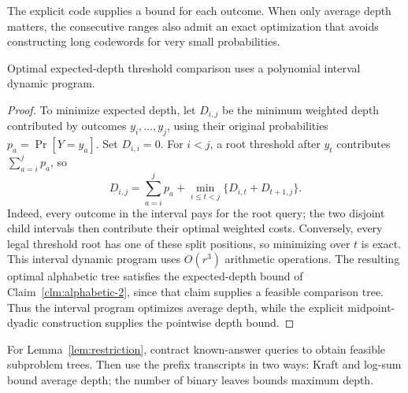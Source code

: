 The explicit code supplies a bound for each outcome. When only average
depth matters, the consecutive ranges also admit an exact optimization
that avoids constructing long codewords for very small probabilities.

\begin{claim}
\label{clm:alphabetic-3}
Optimal expected-depth threshold comparison uses a polynomial interval dynamic program.
\end{claim}
\begin{proof}
To minimize expected depth, let $D_{i,j}$ be the minimum weighted
depth contributed by outcomes $y_i,\ldots,y_j$, using their original
probabilities $p_a=\Pr[Y=y_a]$. Set $D_{i,i}=0$. For $i<j$, a root
threshold after $y_t$ contributes $\sum_{a=i}^j p_a$, so
\[
 D_{i,j}=\sum_{a=i}^j p_a+
       \min_{i\le t<j}\{D_{i,t}+D_{t+1,j}\}.
\]
Indeed, every outcome in the interval pays for the root query;
the two disjoint child intervals then contribute their optimal
weighted costs. Conversely, every legal threshold root has one of
these split positions, so minimizing over $t$ is exact.
This interval dynamic program uses $O(r^3)$ arithmetic operations.
The resulting optimal alphabetic tree satisfies the
expected-depth bound of Claim~\ref{clm:alphabetic-2}, since that
claim supplies a feasible comparison tree. Thus the interval program
optimizes average depth, while the explicit midpoint-dyadic
construction supplies the pointwise depth bound.
\end{proof}



\begin{proofstrategy}
For Lemma~\ref{lem:restriction}, contract known-answer queries to
obtain feasible subproblem trees. Then use the prefix transcripts in
two ways: Kraft and log-sum bound average depth; the number of binary
leaves bounds maximum depth.
\end{proofstrategy}

